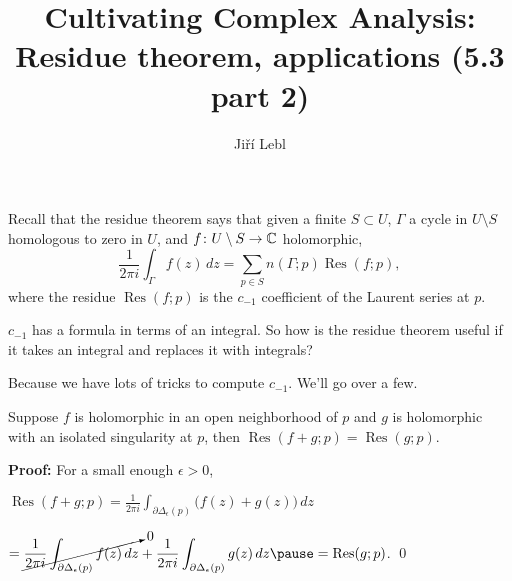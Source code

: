 \documentclass[10pt,aspectratio=169]{beamer}
\author{Ji\v{r}\'i Lebl}
\institute[OSU]{%
Departemento pri Matematiko de Oklahoma {\^S}tata Universitato}
\title{Cultivating Complex Analysis:\\%
Residue theorem, applications (5.3 part 2)}
\date{}
\begin{document}
\begin{frame}
\titlepage
\end{frame}

\begin{frame}
Recall that the residue theorem says that given a finite $S \subset U$,
$\Gamma$ a cycle in $U \setminus S$ homologous to zero in $U$,
and $f \colon U \setminus S \to {\mathbb{C}}$ holomorphic,
\[
\frac{1}{2\pi i} \int_{\Gamma} f(z) \, dz = \sum_{p \in S} n(\Gamma;p) \operatorname{Res}(f;p) ,
\]
where the residue $\operatorname{Res}(f;p)$ is the $c_{-1}$ coefficient of the
Laurent series at $p$.

\medskip
\pause

$c_{-1}$ has a formula in terms of an integral.
\pause
So how is the residue theorem useful if it takes an integral and replaces
it with integrals?

\medskip
\pause

Because we have lots of tricks to compute $c_{-1}$.
We'll go over a few.

\end{frame}

\begin{frame}
\begin{proposition}
Suppose $f$ is holomorphic in an open neighborhood of $p$ and $g$ is holomorphic
with an isolated singularity at $p$, then
$\operatorname{Res}(f+g;p) = \operatorname{Res}(g;p)$.
\end{proposition}

\pause

\textbf{Proof:}
For a small enough $\epsilon > 0$,

\medskip
\quad
$\displaystyle
\operatorname{Res}(f+g;p)
=
\frac{1}{2\pi i}
\int_{\partial \Delta_{\epsilon}(p)}
\bigl(f(z)+g(z)\bigr) \, dz
$

\medskip
\pause

\hfill
\hfill
\hfill
$\displaystyle
=
\cancelto{0}{
\frac{1}{2\pi i}
\int_{\partial \Delta_{\epsilon}(p)}
f(z) \, dz
}
+
\frac{1}{2\pi i}
\int_{\partial \Delta_{\epsilon}(p)}
g(z) \, dz
\pause
=
\operatorname{Res}(g;p)$.
\qed
\end{frame}
\end{document}
